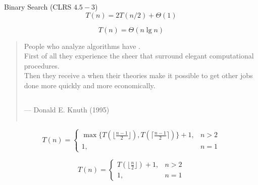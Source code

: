 
\begin{frame}{}
  \begin{exampleblock}{Binary Search (CLRS $4.5-3$)}
    \[
      T(n) = 2T(n/2) + \Theta(1)
    \]
  \end{exampleblock}

  \[
    T(n) = \Theta(n \lg n)
  \]
\end{frame}

\begin{frame}{}

  \begin{quote}
    {\large People who analyze algorithms have . \\[8pt]

    First of all they experience the sheer 
    that surround elegant computational procedures. \\[6pt]

    Then they receive a  when their theories 
    make it possible to get other jobs done more quickly and more economically.} \\[4pt]

    \begin{columns}[t]
	--- Donald E. Knuth (1995)
    \end{columns}
  \end{quote}
\end{frame}

\begin{frame}{}

  \[
    T(n) = \left\{\begin{array}{lr}
      \max\Big\{T(\lfloor \frac{n-1}{2} \rfloor), T(\lceil \frac{n-1}{2} \rceil)\Big\} + 1, & n > 2 \\
      1, & n = 1
  \end{array}\right.
  \]

  \pause
  \vspace{0.30cm}
  \[
    T(n) = \left\{\begin{array}{lr}
      T(\lfloor \frac{n}{2} \rfloor) + 1, & n > 2 \\
      1, & n = 1
    \end{array}\right.
  \]
\end{frame}

